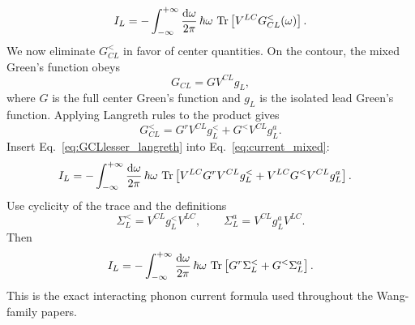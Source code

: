 \begin{equation}
    I_L = -\int_{-\infty}^{+\infty}\frac{\mathrm{d}\omega}{2\pi}\,\hbar\omega\,\operatorname{Tr}\left[ V^{LC}G_{CL}^<(\omega) \right].
    \label{eq:current_mixed}
\end{equation}
We now eliminate $G_{CL}^<$ in favor of center quantities. On the contour, the mixed Green's function obeys
\begin{equation}
    G_{CL} = G V^{CL} g_L,
\end{equation}
where $G$ is the full center Green's function and $g_L$ is the isolated lead Green's function. Applying Langreth rules to the product gives
\begin{equation}
    G_{CL}^< = G^r V^{CL}g_L^< + G^<V^{CL}g_L^a.
    \label{eq:GCLlesser_langreth}
\end{equation}
Insert Eq.~\eqref{eq:GCLlesser_langreth} into Eq.~\eqref{eq:current_mixed}:
\begin{align}
    I_L
    &= -\int_{-\infty}^{+\infty}\frac{\mathrm{d}\omega}{2\pi}\,\hbar\omega\,
    \operatorname{Tr}\left[ V^{LC}G^r V^{CL}g_L^< + V^{LC}G^<V^{CL}g_L^a \right].
\end{align}
Use cyclicity of the trace and the definitions
\begin{equation}
    \Sigma_L^< = V^{CL}g_L^<V^{LC},
    \qquad
    \Sigma_L^a = V^{CL}g_L^aV^{LC}.
\end{equation}
Then
\begin{equation}
    I_L = -\int_{-\infty}^{+\infty}\frac{\mathrm{d}\omega}{2\pi}\,\hbar\omega\,
    \operatorname{Tr}\left[ G^r\Sigma_L^< + G^<\Sigma_L^a \right].
    \label{eq:current_left}
\end{equation}
This is the exact interacting phonon current formula used throughout the Wang-family papers.

